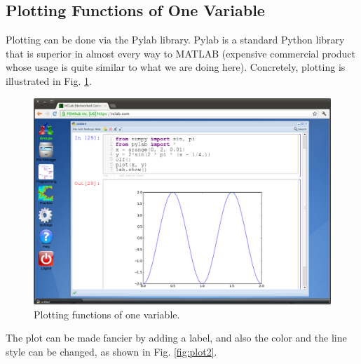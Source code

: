 \documentclass[article,A4,12pt]{llncs}
\begin{document}
\subsection{Plotting Functions of One Variable}

Plotting can be done via the Pylab library. Pylab is a standard Python library that is 
superior in almost every way to MATLAB (expensive commercial product whose usage is 
quite similar to what we are doing here). Concretely, plotting is illustrated in Fig. \ref{fig:plot}.

\begin{figure}[!ht]
\begin{center}
\includegraphics[width=\textwidth]{img/plot.png}
\end{center}
\vspace{-2mm}
\caption{Plotting functions of one variable.}
\label{fig:plot}
\vspace{-1cm}
\end{figure}
\newpage
The plot can be made fancier by adding a label, and also the color 
and the line style can be changed, as shown in Fig. \ref{fig:plot2}.
\end{document}
